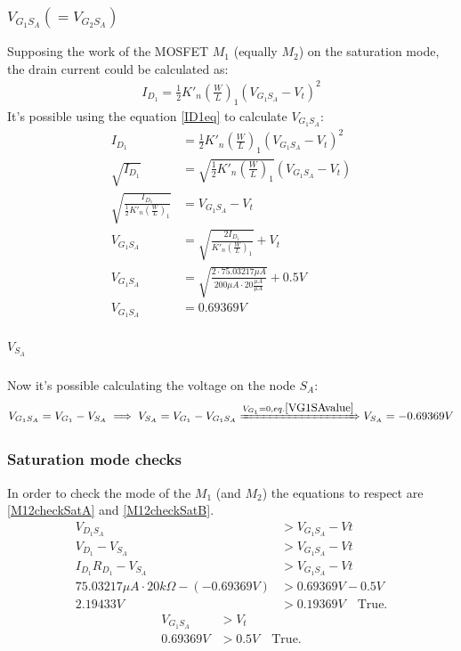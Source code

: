 \documentclass[10pt,a4paper]{book}
\begin{document}
\subsubsection{$V_{G_1S_A} ( = V_{G_2S_A})$}
Supposing the work of the MOSFET $M_1$ (equally $M_2$) on the saturation mode, the drain current could be calculated as:\\
\begin{align}
I_{D_1} = \frac{1}{2} K'_n \left(\frac{W}{L}\right)_1 (V_{G_1S_A} - V_t)^2 \label{ID1eq}
\end{align}
It's possible using the equation \ref{ID1eq} to calculate $V_{G_1S_A}$:\\
\begin{align}
I_{D_1} &= \frac{1}{2} K'_n \left(\frac{W}{L}\right)_1 (V_{G_1S_A} - V_t)^2\\
\sqrt{I_{D_1}} &= \sqrt{\frac{1}{2} K'_n \left(\frac{W}{L}\right)_1} (V_{G_1S_A} - V_t)\\
\sqrt{\frac{I_{D_1}}{\frac{1}{2} K'_n \left(\frac{W}{L}\right)_1}} &= V_{G_1S_A} - V_t\\
V_{G_1S_A} &= \sqrt{\frac{2I_{D_1}}{K'_n \left(\frac{W}{L}\right)_1}} +V_t\\
V_{G_1S_A} &= \sqrt{\frac{2 \cdot 75.03217 \mu A}{200 \mu A \cdot 20 \frac{\mu A}{\mu A}}} +0.5V\\
V_{G_1S_A} &= 0.69369V \label{VG1SAvalue}
\end{align}

\subparagraph{$V_{S_A}$}
Now it's possible calculating the voltage on the node $S_A$:
\begin{align}
V_{G_1S_A} = V_{G_1} - V_{S_A} \implies V_{S_A} = V_{G_1} - V_{G_1S_A}
\xRightarrow{V_{G_1} = 0, eq. \ref{VG1SAvalue}} V_{S_A} = -0.69369V
\end{align}

\subsubsection{Saturation mode checks}
In order to check the mode of the $M_1$ (and $M_2$) the equations to respect are \ref{M12checkSatA} and \ref{M12checkSatB}.\\
\begin{align}
V_{D_1S_A} &> V_{G_1S_A} - Vt \label{M12checkSatA}\\
V_{D_1} - V_{S_A} &> V_{G_1S_A} - Vt\\
I_{D_1}R_{D_1} - V_{S_A} &> V_{G_1S_A} - Vt\\
75.03217 \mu A \cdot 20k\Omega - (-0.69369V)&> 0.69369V - 0.5V\\
2.19433V &> 0.19369V \quad \text{True.}
\end{align}
\begin{align}
V_{G_1S_A} &> V_t \label{M12checkSatB}\\
0.69369V &> 0.5V \quad \text{True.}
\end{align}
\end{document}
